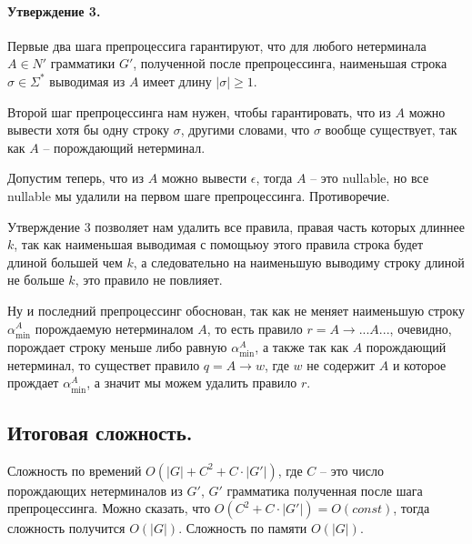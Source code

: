 \documentclass[12pt]{article}
\begin{document}
\paragraph{Утверждение 3.} Первые два шага препроцессига гарантируют, что для
любого нетерминала $ A \in N' $ грамматики $ G' $, полученной после
препроцессинга, наименьшая строка $ \sigma \in \Sigma^* $ выводимая из $ A $
имеет длину $ |\sigma| \ge 1 $.

Второй шаг препроцессинга нам нужен, чтобы гарантировать, что из $ A $ можно
вывести хотя бы одну строку $ \sigma $, другими словами, что $ \sigma $ вообще
существует, так как $ A $ -- порождающий нетерминал.

Допустим теперь, что из $ A $ можно вывести $ \epsilon $, тогда $ A $ -- это
nullable, но все nullable мы удалили на первом шаге препроцессинга.
Противоречие.

Утверждение 3 позволяет нам удалить все правила, правая часть которых длиннее
$ k $, так как наименьшая выводимая с помощьюу этого правила строка будет
длиной большей чем $ k $, а следовательно на наименьшую выводиму строку
длиной не больше $ k $, это правило не повлияет.

Ну и последний препроцессинг обоснован, так как не меняет наименьшую строку
$ \alpha^A_{\min} $ порождаемую нетерминалом $ A $, то есть правило
$ r = A \rightarrow ... A ... $, очевидно, порождает строку меньше либо
равную $ \alpha^A_{\min} $, а также так как $ A $ порождающий нетерминал,
то существет правило $ q = A \rightarrow w $, где $ w $ не содержит $ A $ и
которое прождает $ \alpha^A_{\min} $, а значит мы можем удалить правило
$ r $.

\subsection{Итоговая сложность.}
Сложность по времений $ O(|G| + C^2 + C \cdot |G'|) $,
где $ C $ -- это число порождающих нетерминалов из $ G' $, $ G' $ грамматика
полученная после шага препроцессинга. Можно сказать, что
$ O(C^2 + C \cdot |G'|) = O(const) $, тогда сложность получится $ O(|G|)$.
Сложность по памяти $ O(|G|) $.
\end{document}

